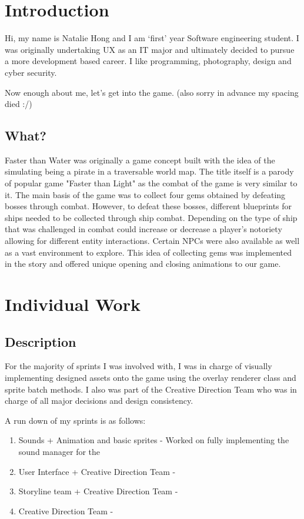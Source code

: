 \documentclass[11pt, oneside, a4paper]{article}
\begin{document}
\section{Introduction}
Hi, my name is Natalie Hong and I am `first' year Software engineering 
student. I was originally undertaking UX as an IT major and ultimately decided 
to pursue a more development based career. I like programming, photography, 
design and cyber security. 

Now enough about me, let's get into the game. (also sorry in advance my spacing died :/)

\subsection{What?}
Faster than Water was originally a game concept built with the idea of the simulating 
being a pirate in a traversable world map. The title itself is a parody of popular game "Faster than Light" 
as the combat of the game is very similar to it. The main basis of the game was to collect four gems obtained by 
defeating bosses through combat. However, to defeat these bosses, different blueprints for ships needed to be collected
through ship combat. Depending on the type of ship that was challenged in combat could increase or decrease a player's notoriety 
allowing for different entity interactions. Certain NPCs were also available as well as a vast environment to explore. 
This idea of collecting gems was implemented in the story and offered unique opening and closing animations to our game. 

\section{Individual Work}

\subsection{Description}
For the majority of sprints I was involved with, I was in charge of visually implementing designed assets onto 
the game using the overlay renderer class and sprite batch methods. I also was part of the Creative Direction Team 
who was in charge of all major decisions and design consistency. 

A run down of my sprints is as follows:
\begin{enumerate}
    \item Sounds + Animation and basic sprites - Worked on fully implementing the sound manager for the 
    \item User Interface + Creative Direction Team - 
    \item Storyline team + Creative Direction Team - 
    \item Creative Direction Team - 
\end{enumerate}
\end{document}
